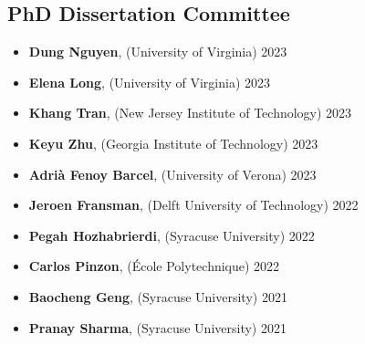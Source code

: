 \subsection*{PhD Dissertation Committee}
\begin{itemize}
  \item \textbf{Dung Nguyen}, ({\sc University of Virginia}) \hfill 2023
  \item \textbf{Elena Long}, ({\sc University of Virginia}) \hfill 2023
  \item \textbf{Khang Tran}, ({\sc New Jersey Institute of Technology}) \hfill 2023
  \item \textbf{Keyu Zhu}, ({\sc Georgia Institute of Technology}) \hfill 2023
  \item \textbf{Adrià Fenoy Barcel}, ({\sc University of Verona}) \hfill 2023
  \item \textbf{Jeroen Fransman}, ({\sc Delft University of Technology}) \hfill 2022
  \item \textbf{Pegah Hozhabrierdi}, ({\sc Syracuse University}) \hfill 2022
  \item \textbf{Carlos Pinzon}, ({\sc École Polytechnique}) \hfill 2022
  \item \textbf{Baocheng Geng}, ({\sc Syracuse University}) \hfill 2021
  \item \textbf{Pranay Sharma}, ({\sc Syracuse University}) \hfill 2021
\end{itemize}
\medskip